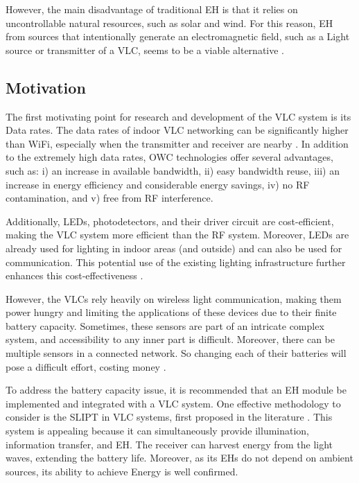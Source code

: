 However, the main disadvantage of traditional \ac{EH} is that it relies on uncontrollable natural resources, such as solar and wind. For this reason, \ac{EH} from sources that intentionally generate an electromagnetic field, such as a Light source or transmitter of a \ac{VLC}, seems to be a viable alternative \cite{diamantoulakis2018simultaneous}.


\subsection{Motivation}
 

The first motivating point for research and development of the \ac{VLC} system is its Data rates. The data rates of indoor \ac{VLC} networking can be significantly higher than WiFi, especially when the transmitter and receiver are nearby \cite{mossaad2015visible}. In addition to the extremely high data rates, \ac{OWC} technologies offer several advantages, such as: i) an increase in available bandwidth, ii) easy bandwidth reuse, iii) an increase in energy efficiency and considerable energy savings, iv) no \ac{RF} contamination, and v) free from
\ac{RF} interference. 

Additionally, LEDs, photodetectors, and their driver circuit are cost-efficient, making the \ac{VLC} system more efficient than the \ac{RF} system. Moreover, LEDs are already used for lighting in indoor areas (and outside) and can also be used for communication. This potential use of the existing lighting infrastructure further enhances this cost-effectiveness\cite{mossaad2015visible} \cite{kavehrad2010sustainable}. 

However, the \ac{VLC}s rely heavily on wireless light communication, making them power hungry and limiting the applications of these devices due to their finite battery capacity. Sometimes, these sensors are part of an intricate complex system, and accessibility to any inner part is difficult. Moreover, there can be multiple sensors in a connected network. So changing each of their batteries will pose a difficult effort, costing money \cite{diamantoulakis2018simultaneous}.


To address the battery capacity issue, it is recommended that an \ac{EH} module be implemented and integrated with a \ac{VLC} system. One effective methodology to consider is the \ac{SLIPT} in \ac{VLC} systems, first proposed in the literature \cite{diamantoulakis2018simultaneous}. This system is appealing because it can simultaneously provide illumination, information transfer, and \ac{EH}. The receiver can harvest energy from the light waves, extending the battery life. Moreover, as its \ac{EH}s do not depend on ambient sources, its ability to achieve Energy is well confirmed.

